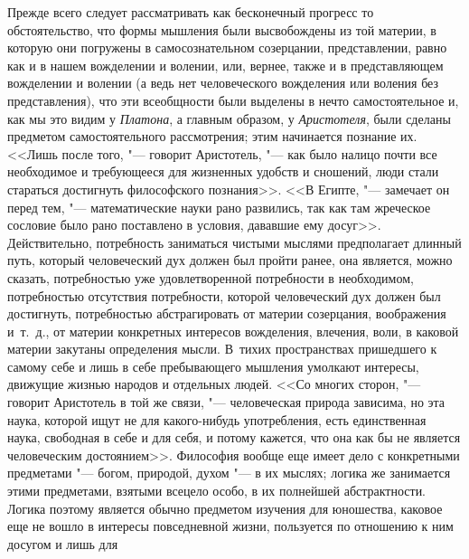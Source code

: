 Прежде всего следует рассматривать как бесконечный прогресс то
обстоятельство, что формы мышления были высвобождены из той материи, в
которую они погружены в самосознательном созерцании, представлении, равно
как и в нашем вожделении и волении, или, вернее, также и в представляющем
вожделении и волении (а ведь нет человеческого вожделения или воления без
представления), что эти всеобщности были выделены в нечто самостоятельное
и, как мы это видим у {\em Платона}, а главным образом,
у {\em Аристотеля}, были сделаны предметом
самостоятельного рассмотрения; этим начинается познание их. <<Лишь после
того, "--- говорит Аристотель, "--- как было налицо почти все необходимое и
требующееся для жизненных удобств и сношений, люди стали стараться
достигнуть философского
познания>>.
<<В Египте, "--- замечает он перед тем, "--- математические науки рано
развились, так как там жреческое сословие было рано поставлено в условия,
дававшие ему досуг>>.
Действительно, потребность заниматься чистыми мыслями предполагает длинный
путь, который человеческий дух должен был пройти ранее, она является, можно
сказать, потребностью уже удовлетворенной потребности в необходимом,
потребностью отсутствия потребности, которой человеческий дух должен был
достигнуть, потребностью абстрагировать от материи созерцания, воображения
и~т.~д., от материи конкретных интересов вожделения, влечения, воли, в
каковой материи закутаны определения мысли. В~тихих пространствах
пришедшего к самому себе и лишь в себе пребывающего мышления умолкают
интересы, движущие жизнью народов и отдельных людей. <<Со многих сторон, "---
говорит Аристотель в той же связи, "--- человеческая природа зависима, но эта
наука, которой ищут не для какого-нибудь употребления, есть единственная
наука, свободная в себе и для себя, и потому кажется, что она как бы не
является человеческим
достоянием>>.
Философия вообще еще имеет дело с конкретными предметами "--- богом, природой,
духом "--- в их мыслях; логика же занимается этими предметами, взятыми всецело
особо, в их полнейшей абстрактности. Логика поэтому является обычно
предметом изучения для юношества, каковое еще не вошло в интересы
повседневной жизни, пользуется по отношению к ним досугом и лишь для

